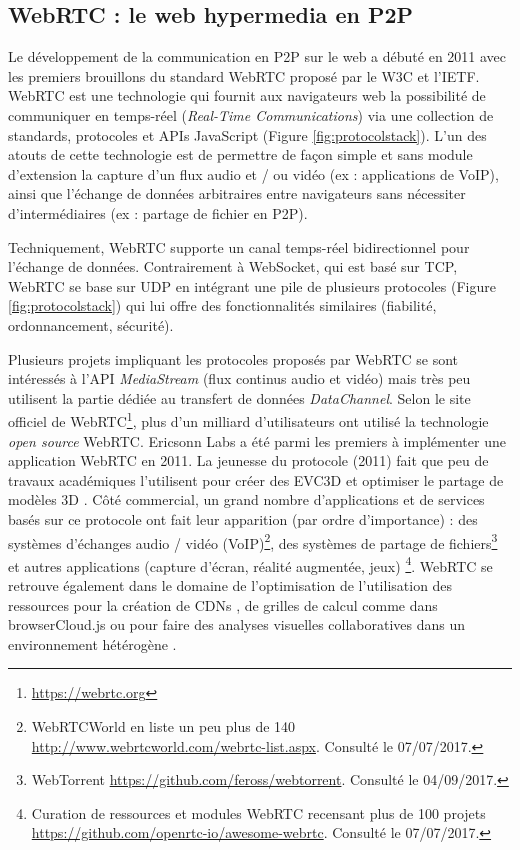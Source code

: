 \subsection{WebRTC : le web hypermedia en P2P}
\label{sec:webrtc}
Le développement de la communication en \gls{P2P} sur le web a 
débuté en 2011 avec les premiers brouillons du standard \gls{WebRTC} proposé 
par le \gls{W3C} et l'\gls{IETF}\textsuperscript{\textregistered}. 
\gls{WebRTC} est une technologie qui fournit aux navigateurs web la possibilité de 
communiquer en temps-réel (\textit{Real-Time Communications}) via une collection 
de standards, protocoles et \glspl{API} JavaScript (Figure \ref{fig:protocolstack}). 
L'un des atouts de cette technologie est de permettre de façon simple et 
sans module d'extension la capture d'un flux audio et / ou vidéo (ex : 
applications de VoIP), ainsi que l'échange de données arbitraires entre 
navigateurs sans nécessiter d'intermédiaires (ex : partage de fichier en 
P2P).


Techniquement, \gls{WebRTC} supporte un canal temps-réel 
bidirectionnel pour l'échange de données. Contrairement à 
\gls{WebSocket}, qui est basé sur \gls{TCP}, \gls{WebRTC} se base sur 
\acrshort{UDP} en intégrant une pile de plusieurs protocoles (Figure 
\ref{fig:protocolstack}) qui lui offre des fonctionnalités similaires (fiabilité, 
ordonnancement, sécurité). 


Plusieurs projets impliquant les protocoles proposés par \gls{WebRTC} 
se sont intéressés à l'\gls{API} \textit{MediaStream} (flux continus audio 
et vidéo) mais très peu utilisent la partie dédiée au transfert de données 
\textit{DataChannel}. 
Selon le site officiel de WebRTC\footnote{\url{https://webrtc.org}}, plus d'un milliard 
d'utilisateurs ont utilisé la technologie \textit{open source} WebRTC. Ericsonn Labs 
a été parmi les premiers à implémenter une application WebRTC en 2011. 
La jeunesse du protocole (2011) fait que peu de travaux académiques 
l'utilisent pour créer des \gls{EVC3D} \cite{Desprat2015a,Steiakaki2016} et 
optimiser le partage de modèles \gls{3D} \cite{Koskela2014}. 
Côté commercial, un grand nombre d'applications et de services 
basés sur ce protocole ont fait leur apparition (par ordre d'importance) : 
des systèmes d'échanges audio / vidéo (VoIP)\footnote{WebRTCWorld en 
	liste un peu plus de 140 
	\url{http://www.webrtcworld.com/webrtc-list.aspx}. Consulté le 
	07/07/2017.}, des systèmes de partage de fichiers\footnote{WebTorrent 
	\url{https://github.com/feross/webtorrent}. Consulté le 04/09/2017.} et 
autres applications (capture d'écran, réalité augmentée, jeux)
\footnote{Curation de ressources et modules WebRTC 
	recensant plus de 100 projets 
	\url{https://github.com/openrtc-io/awesome-webrtc}. Consulté le 
	07/07/2017.}. WebRTC se retrouve également dans le domaine de l'optimisation 
	de l'utilisation des ressources pour la création de \glspl{CDN} 
	\cite{Zhang2013b}, de grilles de calcul comme dans
	browserCloud.js \cite{Dias2015a} ou pour faire des analyses visuelles 
	collaboratives dans un environnement hétérogène \cite{Li2015}.


